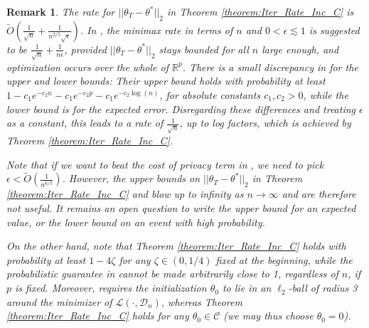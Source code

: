 \documentclass{article}
\newtheorem{remark}{\textbf{Remark}}
\begin{document}
\begin{remark}
\label{remark:Compare_Iter_Inc_C_to_Cost_Priv}
The rate for $||\theta_T - \theta^*||_2$ in Theorem \ref{theorem:Iter_Rate_Inc_C} is $\widetilde{O}\left(\frac{1}{\sqrt{n}} + \frac{1}{n^{2/5}\sqrt{\epsilon}}\right)$. In \cite{Cai_Cost_GLM}, the minimax rate in terms of $n$ and $0 < \epsilon \lesssim 1$ is suggested to be $\frac{1}{\sqrt{n}} + \frac{1}{n\epsilon}$, provided $||\theta_T - \theta^*||_2$ stays bounded for all $n$ large enough, and optimization occurs over the whole of $\mathbb{R}^p$. There is a small discrepancy in \cite{Cai_Cost_GLM} for the upper and lower bounds: Their upper bound holds with probability at least $1 - c_1e^{-c_2n} - c_1e^{-c_2p} - c_1e^{-c_2\log(n)}$, for absolute constants $c_1, c_2 > 0$, while the lower bound is for the expected error. Disregarding these differences and treating $\epsilon$ as a constant, this leads to a rate of $\frac{1}{\sqrt{n}}$, up to log factors, which is achieved by Theorem \ref{theorem:Iter_Rate_Inc_C}. 

Note that if we want to beat the cost of privacy term in \cite{Cai_Cost_GLM}, we need to pick $\epsilon < \widetilde{O}\left(\frac{1}{n^{6/5}}\right)$. However, the upper bounds on $||\theta_T - \theta^*||_2$ in Theorem \ref{theorem:Iter_Rate_Inc_C} and \cite{Cai_Cost_GLM} blow up to infinity as $n \rightarrow \infty$ and are therefore not useful. %
It remains an open question to write the upper bound for an expected value, or the lower bound on an event with high probability.

On the other hand, note that Theorem \ref{theorem:Iter_Rate_Inc_C} holds with probability at least $1-4\zeta$ for any $\zeta\in(0,1/4)$ fixed at the beginning, while the probabilistic guarantee in \cite{Cai_Cost_GLM} cannot be made arbitrarily close to 1, regardless of $n$, if $p$ is fixed. Moreover, \cite{Cai_Cost_GLM} requires the initialization $\theta_0$ to lie in an $\ell_2$-ball of radius 3 around the minimizer of $\mathcal{L}(\cdot, \mathcal{D}_n)$, whereas Theorem \ref{theorem:Iter_Rate_Inc_C} holds for any $\theta_0 \in \mathcal{C}$ (we may thus choose $\theta_0 = 0$).
\end{remark}
\end{document}
